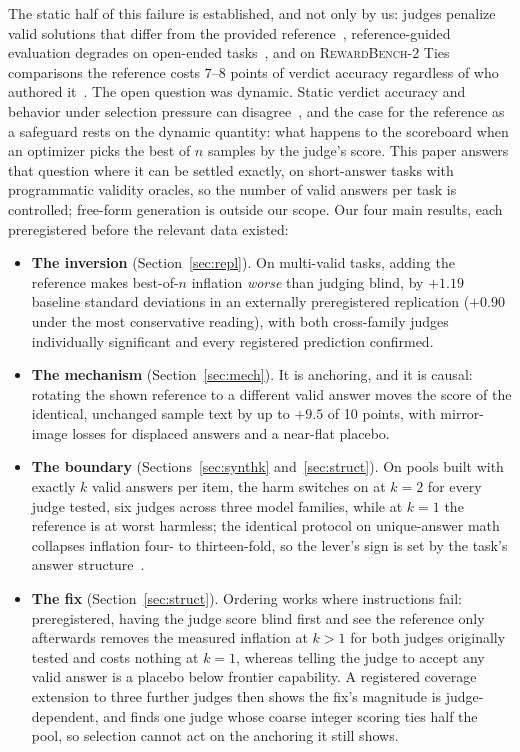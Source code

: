 \documentclass[11pt]{article}
\begin{document}
The static half of this failure is established, and not only by us: judges penalize valid solutions that differ from the provided reference~\cite{fixation2025}, reference-guided evaluation degrades on open-ended tasks~\cite{judgingref2026}, and on \textsc{RewardBench-2} Ties comparisons the reference costs $7$--$8$ points of verdict accuracy regardless of who authored it~\cite{companionA,malik2025rewardbench2}.
The open question was dynamic.
Static verdict accuracy and behavior under selection pressure can disagree~\cite{gao2022scaling}, and the case for the reference as a safeguard rests on the dynamic quantity: what happens to the scoreboard when an optimizer picks the best of $n$ samples by the judge's score.
This paper answers that question where it can be settled exactly, on short-answer tasks with programmatic validity oracles, so the number of valid answers per task is controlled; free-form generation is outside our scope.
Our four main results, each preregistered before the relevant data existed:

\begin{itemize}
\item \textbf{The inversion} (Section~\ref{sec:repl}).
On multi-valid tasks, adding the reference makes best-of-$n$ inflation \emph{worse} than judging blind, by $+1.19$ baseline standard deviations in an externally preregistered replication ($+0.90$ under the most conservative reading), with both cross-family judges individually significant and every registered prediction confirmed.
\item \textbf{The mechanism} (Section~\ref{sec:mech}).
It is anchoring, and it is causal: rotating the shown reference to a different valid answer moves the score of the identical, unchanged sample text by up to $+9.5$ of 10 points, with mirror-image losses for displaced answers and a near-flat placebo.
\item \textbf{The boundary} (Sections~\ref{sec:synthk} and~\ref{sec:struct}).
On pools built with exactly $k$ valid answers per item, the harm switches on at $k{=}2$ for every judge tested, six judges across three model families, while at $k{=}1$ the reference is at worst harmless; the identical protocol on unique-answer math collapses inflation four- to thirteen-fold, so the lever's sign is set by the task's answer structure~\cite{companionA}.
\item \textbf{The fix} (Section~\ref{sec:struct}).
Ordering works where instructions fail: preregistered, having the judge score blind first and see the reference only afterwards removes the measured inflation at $k{>}1$ for both judges originally tested and costs nothing at $k{=}1$, whereas telling the judge to accept any valid answer is a placebo below frontier capability.
A registered coverage extension to three further judges then shows the fix's magnitude is judge-dependent, and finds one judge whose coarse integer scoring ties half the pool, so selection cannot act on the anchoring it still shows.
\end{itemize}
\end{document}
